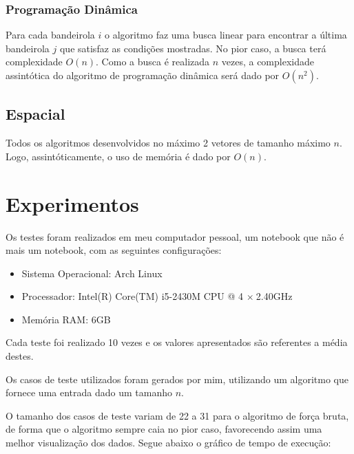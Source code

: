 \documentclass[
	12pt,
	a4paper,
	onepage,
	brazil
]{article}
\begin{document}
	\subsubsection{Programação Dinâmica}
	
	Para cada bandeirola $i$ o algoritmo faz uma busca linear para encontrar a última bandeirola $j$ que satisfaz as condições mostradas. No pior caso, a busca terá complexidade $O(n)$. Como a busca é realizada $n$ vezes, a complexidade assintótica do algoritmo de programação dinâmica será dado por $O(n^2)$.
	
	\subsection{Espacial}
	
	Todos os algoritmos desenvolvidos no máximo 2 vetores de tamanho máximo $n$. Logo, assintóticamente, o uso de memória é dado por $O(n)$.
	
	\section{Experimentos}
	
	Os testes foram realizados em meu computador pessoal, um notebook que não é mais um notebook, com as seguintes configurações:
	
	\begin{itemize}
		\item Sistema Operacional: Arch Linux
		\item Processador: Intel(R) Core(TM) i5-2430M CPU @ 4 $\times \ $2.40GHz
		\item Memória RAM: 6GB
	\end{itemize}
	
	Cada teste foi realizado 10 vezes e os valores apresentados são referentes a média destes.
	
	Os casos de teste utilizados foram gerados por mim, utilizando um algoritmo que fornece uma entrada dado um tamanho $n$.
	
	O tamanho dos casos de teste variam de 22 a 31 para o algoritmo de força bruta, de forma que o algoritmo sempre caia no pior caso, favorecendo assim uma melhor visualização dos dados. Segue abaixo o gráfico de tempo de execução:
	
\end{document}
